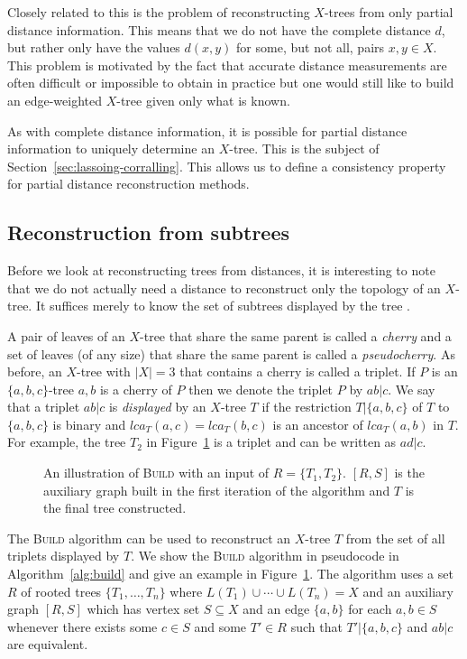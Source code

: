 Closely related to this is the problem of reconstructing $X$-trees from only
partial distance information.  This means that we do not have the complete
distance $d$, but rather only have the values $d(x,y)$ for some, but not all,
pairs $x,y \in X$.  This problem is motivated by the fact that accurate
distance measurements are often difficult or impossible to obtain in practice
but one would still like to build an edge-weighted $X$-tree given only what is
known.

As with complete distance information, it is possible for partial distance
information to uniquely determine an $X$-tree.  This is the subject of
Section~\ref{sec:lassoing-corralling}.  This allows us to define a consistency
property for partial distance reconstruction methods.

\subsection{Reconstruction from subtrees}
\label{sec:constr-from-subtr}

Before we look at reconstructing trees from distances, it is interesting to
note that we do not actually need a distance to reconstruct only the topology
of an $X$-tree.  It suffices merely to know the set of subtrees displayed by
the tree \cite{semple2003phylogenetics}.

A pair of leaves of an $X$-tree that share the same parent is called a
\textit{cherry} and a set of leaves (of any size) that share the same parent
is called a \textit{pseudocherry}.  As before, an $X$-tree with $|X| = 3$ that
contains a cherry is called a triplet.  If $P$ is an $\{a,b,c\}$-tree $a,b$ is
a cherry of $P$ then we denote the triplet $P$ by $ab|c$.  We say that a
triplet $ab|c$ is \textit{displayed} by an $X$-tree $T$ if the restriction
$T|\{a,b,c\}$ of $T$ to $\{a,b,c\}$ is binary and $lca_T(a,c) = lca_T(b,c)$ is
an ancestor of $lca_T(a,b)$ in $T$.  For example, the tree $T_2$ in
Figure~\ref{fig:build-ex} is a triplet and can be written as $ad|c$.

\begin{figure}
  \centering
  
  \caption{An illustration of \textsc{Build} with an input of $R =
    \{T_1,T_2\}$.  $[R,S]$ is the auxiliary graph built in the first iteration
    of the algorithm and $T$ is the final tree constructed.}
  \label{fig:build-ex}
\end{figure}

The \textsc{Build} algorithm \cite{aho1981inferring} can be used to
reconstruct an $X$-tree $T$ from the set of all triplets displayed by $T$.  We
show the \textsc{Build} algorithm in pseudocode in Algorithm~\ref{alg:build}
and give an example in Figure~\ref{fig:build-ex}.  The algorithm uses a set
$R$ of rooted trees $\{T_1,\dotsc,T_n\}$ where $L(T_1) \cup \dotsb \cup L(T_n)
= X$ and an auxiliary graph $[R,S]$ which has vertex set $S \subseteq X$ and
an edge $\{a,b\}$ for each $a,b \in S$ whenever there exists some $c \in S$
and some $T' \in R$ such that $T'|\{a,b,c\}$ and $ab|c$ are equivalent.


